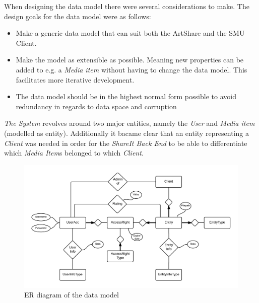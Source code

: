 \documentclass[../report.tex]{subfiles}
\begin{document}
\graphicspath{{img/}{../img/}}

When designing the data model there were several considerations to make. The design goals for the data model were as follows:
\begin{itemize}
\item Make a generic data model that can suit both the ArtShare and the SMU Client.
\item Make the model as extensible as possible. Meaning new properties can be added to e.g. a \textit{Media item} without having to change the data model. This facilitates more iterative development.
\item The data model should be in the highest normal form possible to avoid redundancy in regards to data space and corruption
\end{itemize} 






\textit{The System} revolves around two major entities, namely the \textit{User} and \textit{Media item} (modelled as entity). Additionally it bacame clear that an entity representing a \textit{Client} was needed in order for the \textit{ShareIt Back End} to be able to differentiate which \textit{Media Item}s belonged to which \textit{Client}. \\


\begin{figure}[H]
\includegraphics[width=\linewidth]{ER.png}
\caption{ER diagram of the data model}
\label{fig:use case diagram}
\end{figure}
\end{document}
